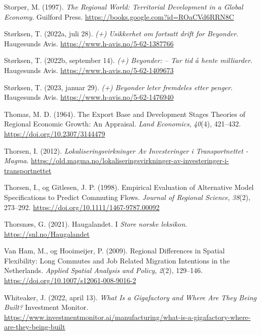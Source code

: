 \documentclass[
]{article}
\newlength{\cslhangindent}
\newlength{\cslentryspacingunit} %
\newenvironment{CSLReferences}[2] %
 {%
  \setlength{\parindent}{0pt}
  \ifodd #1
  \let\oldpar\par
  \def\par{\hangindent=\cslhangindent\oldpar}
  \fi
  \setlength{\parskip}{#2\cslentryspacingunit}
 }%
 {}
\begin{document}
\begin{CSLReferences}{1}{0}
\leavevmode{}%
Storper, M. (1997). \emph{The {Regional World}: {Territorial
Development} in a {Global Economy}}. {Guilford Press}.
\url{https://books.google.com?id=ROaCVd6RRN8C}

\leavevmode{}%
Størksen, T. (2022a, juli 28). \emph{(+) Usikkerhet om fortsatt drift
for Beyonder}. {Haugesunds Avis}.
\url{https://www.h-avis.no/5-62-1387766}

\leavevmode{}%
Størksen, T. (2022b, september 14). \emph{(+) Beyonder: -- Tar tid å
hente milliarder}. {Haugesunds Avis}.
\url{https://www.h-avis.no/5-62-1409673}

\leavevmode{}%
Størksen, T. (2023, januar 29). \emph{(+) Beyonder leter fremdeles etter
penger}. {Haugesunds Avis}. \url{https://www.h-avis.no/5-62-1476940}

\leavevmode{}%
Thomas, M. D. (1964). The {Export Base} and {Development Stages
Theories} of {Regional Economic Growth}: {An Appraisal}. \emph{Land
Economics}, \emph{40}(4), 421--432.
\url{https://doi.org/10.2307/3144479}

\leavevmode{}%
Thorsen, I. (2012). \emph{Lokaliseringsvirkninger Av Investeringer i
Transportnettet - {Magma}}.
\url{https://old.magma.no/lokaliseringsvirkninger-av-investeringer-i-transportnettet}

\leavevmode{}%
Thorsen, I., og Gitlesen, J. P. (1998). Empirical {Evaluation} of
{Alternative Model Specifications} to {Predict Commuting Flows}.
\emph{Journal of Regional Science}, \emph{38}(2), 273--292.
\url{https://doi.org/10.1111/1467-9787.00092}

\leavevmode{}%
Thorsnæs, G. (2021). Haugalandet. I \emph{Store norske leksikon}.
\url{https://snl.no/Haugalandet}

\leavevmode{}%
Van Ham, M., og Hooimeijer, P. (2009). Regional {Differences} in
{Spatial Flexibility}: {Long Commutes} and {Job Related Migration
Intentions} in the {Netherlands}. \emph{Applied Spatial Analysis and
Policy}, \emph{2}(2), 129--146.
\url{https://doi.org/10.1007/s12061-008-9016-2}

\leavevmode{}%
Whiteaker, J. (2022, april 13). \emph{What Is a Gigafactory and Where
Are They Being Built?} {Investment Monitor}.
\url{https://www.investmentmonitor.ai/manufacturing/what-is-a-gigafactory-where-are-they-being-built}

\end{CSLReferences}
\end{document}
